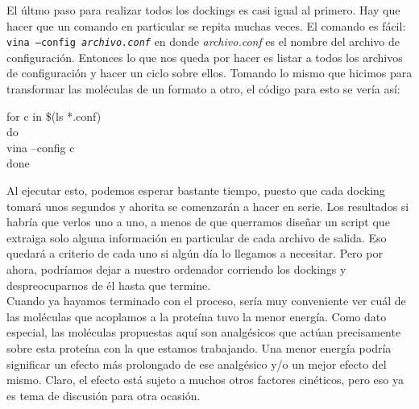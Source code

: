 \documentclass[10pt,letterpaper]{article}
\newcommand{\inlinecode}[1]{
\colorbox{light-gray}{\texttt{#1}}
}
\newenvironment{Code}
{
\begin{lrbox}{\selvestebox}%
\begin{minipage}{\dimexpr\columnwidth-2\fboxsep\relax}
\fontfamily{\ttdefault}\selectfont
}
{\end{minipage}\end{lrbox}%
\begin{center}
\colorbox{light-gray}{\usebox{\selvestebox}}
\end{center}
}
\begin{document}
El \'ultmo paso para realizar todos los dockings es casi igual al primero. Hay que hacer que un comando en particular se repita muchas veces. El comando es f\'acil: \inlinecode{vina --config \emph{archivo.conf}} en donde \emph{archivo.conf} es el nombre del archivo de configuraci\'on. Entonces lo que nos queda por hacer es listar a todos los archivos de configuraci\'on y hacer un ciclo sobre ellos. Tomando lo mismo que hicimos para transformar las mol\'eculas de un formato a otro, el c\'odigo para esto se ver\'ia as\'i:

\begin{Code}
for c in \$(ls *.conf)\\
do\\
vina --config c\\
done
\end{Code}

Al ejecutar esto, podemos esperar bastante tiempo, puesto que cada docking tomar\'a unos segundos y ahorita se comenzar\'an a hacer en serie. Los resultados si habr\'ia que verlos uno a uno, a menos de que querramos dise\~nar un script que extraiga solo alguna informaci\'on en particular de cada archivo de salida. Eso quedar\'a a criterio de cada uno si alg\'un d\'ia lo llegamos a necesitar. Pero por ahora, podr\'iamos dejar a nuestro ordenador corriendo los dockings y despreocuparnos de \'el hasta que termine.\\

Cuando ya hayamos terminado con el proceso, ser\'ia muy conveniente ver cu\'al de las mol\'eculas que acoplamos a la prote\'ina tuvo la menor energ\'ia. Como dato especial, las mol\'eculas propuestas aqu\'i son analg\'esicos que act\'uan precisamente sobre esta prote\'ina con la que estamos trabajando. Una menor energ\'ia podr\'ia significar un efecto m\'as prolongado de ese analg\'esico y/o un mejor efecto del mismo. Claro, el efecto est\'a sujeto a muchos otros factores cin\'eticos, pero eso ya es tema de discusi\'on para otra ocasi\'on.
\end{document}
